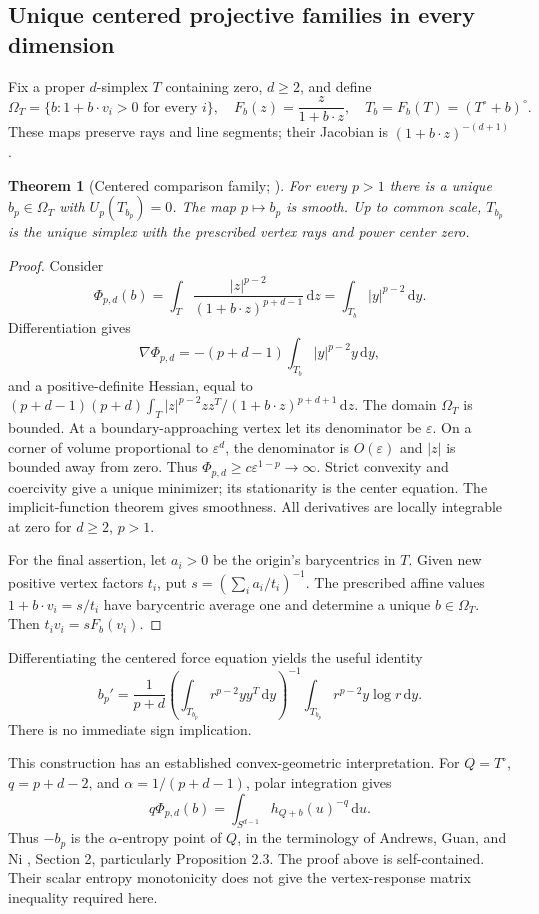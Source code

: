 \documentclass[11pt]{article}
\newtheorem{theorem}{Theorem}[section]
\theoremstyle{definition}
\newcommand{\dd}{\,\mathrm d}
\begin{document}
\subsection{Unique centered projective families in every dimension}
\label{sec:projective}
Fix a proper $d$-simplex $T$ containing zero, $d\ge2$, and define
\[
 \Omega_T=\{b:1+b\cdot v_i>0\text{ for every }i\},\quad
 F_b(z)=\frac z{1+b\cdot z},\quad T_b=F_b(T)=(T^\circ+b)^\circ.
\]
These maps preserve rays and line segments; their Jacobian is
$(1+b\cdot z)^{-(d+1)}$.
\begin{theorem}[Centered comparison family; \cite{Projective}]
For every $p>1$ there is a unique $b_p\in\Omega_T$ with $U_p(T_{b_p})=0$.
The map $p\mapsto b_p$ is smooth. Up to common scale, $T_{b_p}$ is the
unique simplex with the prescribed vertex rays and power center zero.
\end{theorem}
\begin{proof}
Consider
\[
 \Phi_{p,d}(b)=\int_T\frac{|z|^{p-2}}{(1+b\cdot z)^{p+d-1}}\dd z
             =\int_{T_b}|y|^{p-2}\dd y.
\]
Differentiation gives
\[
 \nabla\Phi_{p,d}=-(p+d-1)\int_{T_b}|y|^{p-2}y\dd y,
\]
and a positive-definite Hessian, equal to
$(p+d-1)(p+d)\int_T |z|^{p-2}zz^T/(1+b\cdot z)^{p+d+1}\dd z$.
The domain $\Omega_T$ is bounded. At a boundary-approaching vertex let its
denominator be $\varepsilon$. On a corner of volume proportional to
$\varepsilon^d$, the denominator is $O(\varepsilon)$ and $|z|$ is bounded
away from zero. Thus $\Phi_{p,d}\ge c\varepsilon^{1-p}\to\infty$.
Strict convexity and coercivity give a unique minimizer; its stationarity
is the center equation. The implicit-function theorem gives smoothness.
All derivatives are locally integrable at zero for $d\ge2$, $p>1$.

For the final assertion, let $a_i>0$ be the origin's barycentrics in $T$.
Given new positive vertex factors $t_i$, put
$s=(\sum_i a_i/t_i)^{-1}$. The prescribed affine values
$1+b\cdot v_i=s/t_i$ have barycentric average one and determine a unique
$b\in\Omega_T$. Then $t_iv_i=sF_b(v_i)$.
\end{proof}
Differentiating the centered force equation yields the useful identity
\begin{equation}\label{eq:bdot}
 b_p'=\frac1{p+d}
 \left(\int_{T_{b_p}}r^{p-2}yy^T\dd y\right)^{-1}
 \int_{T_{b_p}}r^{p-2}y\log r\dd y.
\end{equation}
There is no immediate sign implication.

This construction has an established convex-geometric interpretation.
For $Q=T^\circ$, $q=p+d-2$, and $\alpha=1/(p+d-1)$, polar integration gives
\[
 q\Phi_{p,d}(b)=\int_{S^{d-1}}h_{Q+b}(u)^{-q}\dd u.
\]
Thus $-b_p$ is the $\alpha$-entropy point of $Q$, in the terminology of
Andrews, Guan, and Ni \cite{AGN}, Section 2, particularly Proposition 2.3.
The proof above is self-contained. Their scalar entropy monotonicity does
not give the vertex-response matrix inequality required here.
\end{document}
